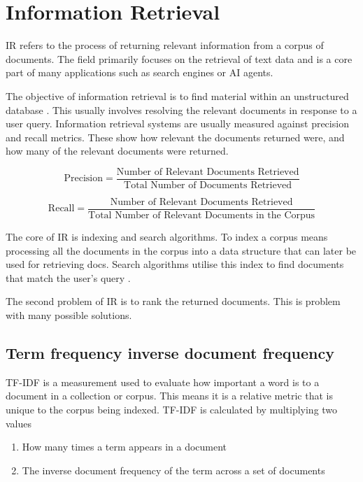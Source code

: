 \section{Information Retrieval}


\gls{IR} refers to the process of returning relevant information from a corpus of documents. The field primarily focuses on the retrieval of text data and is a core part of many applications such as search engines or AI agents.


The objective of information retrieval is to find material within an unstructured database \cite{christopher_d_introduction_2008}. This usually involves resolving the relevant documents in response to a user query. Information retrieval systems are usually measured against precision and recall metrics. These show how relevant the documents returned were, and how many of the relevant documents were returned.


\begin{equation}
        \text{Precision} = \frac{\text{Number of Relevant Documents Retrieved}}{\text{Total Number of Documents Retrieved}}
\end{equation}


\begin{equation}
        \text{Recall} = \frac{\text{Number of Relevant Documents Retrieved}}{\text{Total Number of Relevant Documents in the Corpus}}
\end{equation}


The core of \gls{IR} is indexing and search algorithms. To index a corpus means processing all the documents in the corpus into a data structure that can later be used for retrieving docs. Search algorithms utilise this index to find documents that match the user's query \cite{christopher_d_introduction_2008}.


The second problem of IR is to rank the returned documents. This is problem with many possible solutions.


\subsection{Term frequency inverse document frequency}


\gls{TF-IDF} is a measurement used to evaluate how important a word is to a document in a collection or corpus. This means it is a relative metric that is unique to the corpus being indexed. TF-IDF is calculated by multiplying two values


\begin{enumerate}
        \item How many times a term appears in a document
        \item The inverse document frequency of the term across a set of documents
\end{enumerate}


